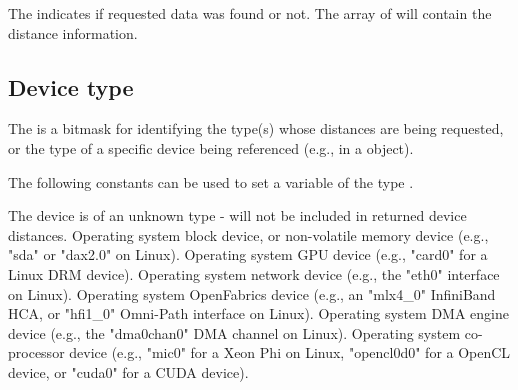\begin{arglist}
\end{arglist}


\descr

The  indicates if requested data was found or not.
The array of  will contain the distance information.

\subsection{Device type}
\label{api:proc:devtype}

The  is a  bitmask for identifying the type(s) whose distances are being requested, or the type of a specific device being referenced (e.g., in a  object).


The following constants can be used to set a variable of the type .

\begin{constantdesc}
%
The device is of an unknown type - will not be included in returned device distances.
%
Operating system block device, or non-volatile memory device (e.g., "sda" or "dax2.0" on Linux).
%
Operating system \ac{GPU} device (e.g., "card0" for a Linux \ac{DRM} device).
%
Operating system network device (e.g., the "eth0" interface on Linux).
%
Operating system OpenFabrics device (e.g., an "mlx4_0" InfiniBand \ac{HCA}, or "hfi1_0" Omni-Path interface on Linux).
%
Operating system \ac{DMA} engine device (e.g., the "dma0chan0" \ac{DMA} channel on Linux).
%
Operating system co-processor device (e.g., "mic0" for a Xeon Phi on Linux, "opencl0d0" for a OpenCL device, or "cuda0" for a \ac{CUDA} device).
%
\end{constantdesc}

